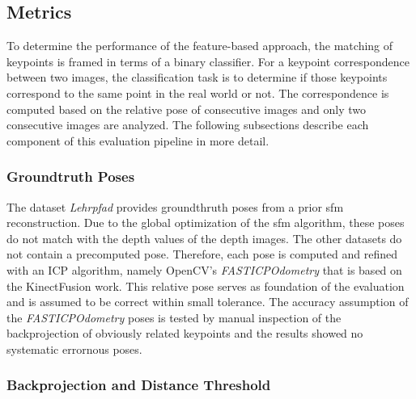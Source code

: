\subsection{Metrics}

To determine the performance of the feature-based approach, the matching of keypoints is framed in terms of a binary classifier.
For a keypoint correspondence between two images, the classification task is to determine if those keypoints correspond to the same point in the real world or not.
The correspondence is computed based on the relative pose of consecutive images and only two consecutive images are analyzed.
The following subsections describe each component of this evaluation pipeline in more detail.

\subsubsection{Groundtruth Poses}

The dataset \emph{Lehrpfad} provides groundthruth poses from a prior \gls{sfm} reconstruction.
Due to the global optimization of the \gls{sfm} algorithm, these poses do not match with the depth values of the depth images.
The other datasets do not contain a precomputed pose.
Therefore, each pose is computed and refined with an ICP algorithm, namely OpenCV's \emph{FASTICPOdometry} that is based on the KinectFusion\cite{newcombe_ismar2011} work.
This relative pose serves as foundation of the evaluation and is assumed to be correct within small tolerance.
The accuracy assumption of the \emph{FASTICPOdometry} poses is tested by manual inspection of the backprojection of obviously related keypoints and the results showed no systematic errornous poses.

\subsubsection{Backprojection and Distance Threshold}

